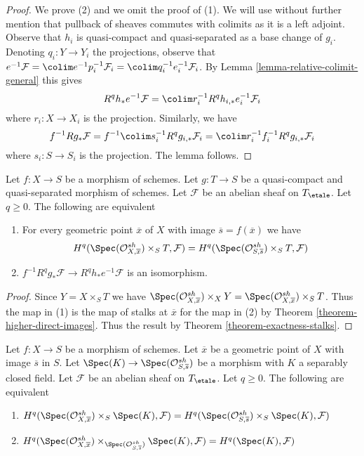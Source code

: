 \begin{proof}
We prove (2) and we omit the proof of (1). We will use without further
mention that pullback of sheaves commutes with colimits as it is a
left adjoint. Observe that $h_i$ is quasi-compact and quasi-separated as a
base change of $g_i$.
Denoting $q_i : Y \to Y_i$ the projections, observe that
$e^{-1}\mathcal{F} = \colim e^{-1}p_i^{-1}\mathcal{F}_i =
\colim q_i^{-1}e_i^{-1}\mathcal{F}_i$.
By Lemma \ref{lemma-relative-colimit-general}
this gives
$$
R^qh_*e^{-1}\mathcal{F} = \colim r_i^{-1}R^qh_{i, *}e_i^{-1}\mathcal{F}_i
$$
where $r_i : X \to X_i$ is the projection.
Similarly, we have
$$
f^{-1}Rg_*\mathcal{F} =
f^{-1}\colim s_i^{-1}R^qg_{i, *}\mathcal{F}_i =
\colim r_i^{-1}f_i^{-1}R^qg_{i, *}\mathcal{F}_i
$$
where $s_i : S \to S_i$ is the projection. The lemma follows.
\end{proof}

\begin{lemma}
\label{lemma-base-change-f-star-general-stalks}
Let $f : X \to S$ be a morphism of schemes. Let $g : T \to S$ be a
quasi-compact and quasi-separated morphism of schemes. Let $\mathcal{F}$ be an
abelian sheaf on $T_\etale$. Let $q \geq 0$. The following are equivalent
\begin{enumerate}
\item For every geometric point $\overline{x}$ of $X$ with image
$\overline{s} = f(\overline{x})$ we have
$$
H^q(\Spec(\mathcal{O}^{sh}_{X, \overline{x}}) \times_S T, \mathcal{F})
=
H^q(\Spec(\mathcal{O}^{sh}_{S, \overline{s}}) \times_S T, \mathcal{F})
$$
\item $f^{-1}R^qg_*\mathcal{F} \to R^qh_*e^{-1}\mathcal{F}$
is an isomorphism.
\end{enumerate}
\end{lemma}

\begin{proof}
Since $Y = X \times_S T$ we have
$\Spec(\mathcal{O}^{sh}_{X, \overline{x}}) \times_X Y =
\Spec(\mathcal{O}^{sh}_{X, \overline{x}}) \times_S T$. Thus
the map in (1) is the map of stalks at $\overline{x}$ for the map
in (2) by Theorem \ref{theorem-higher-direct-images}.
Thus the result by Theorem \ref{theorem-exactness-stalks}.
\end{proof}

\begin{lemma}
\label{lemma-check-stalks-better}
Let $f : X \to S$ be a morphism of schemes.
Let $\overline{x}$ be a geometric point of $X$ with image $\overline{s}$ in $S$.
Let $\Spec(K) \to \Spec(\mathcal{O}^{sh}_{S, \overline{s}})$
be a morphism with $K$ a separably closed field. Let $\mathcal{F}$ be an
abelian sheaf on $T_\etale$. Let $q \geq 0$. The following are equivalent
\begin{enumerate}
\item
$H^q(\Spec(\mathcal{O}^{sh}_{X, \overline{x}}) \times_S \Spec(K), \mathcal{F}) =
H^q(\Spec(\mathcal{O}^{sh}_{S, \overline{s}}) \times_S \Spec(K), \mathcal{F})$
\item
$H^q(\Spec(\mathcal{O}^{sh}_{X, \overline{x}})
\times_{\Spec(\mathcal{O}^{sh}_{S, \overline{s}})} \Spec(K), \mathcal{F}) =
H^q(\Spec(K), \mathcal{F})$
\end{enumerate}
\end{lemma}

